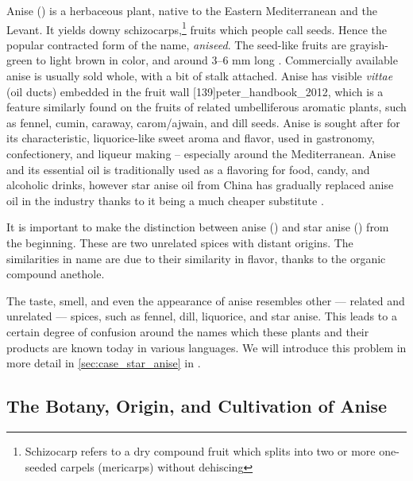 Anise () is a herbaceous plant, native to the Eastern Mediterranean and the Levant. It yields downy schizocarps,\footnote{Schizocarp refers to a dry compound fruit which splits into two or more one-seeded carpels (mericarps) without dehiscing} fruits which people call seeds. Hence the popular contracted form of the name, \textit{aniseed}. The seed-like fruits are grayish-green to light brown in color, and around 3--6 mm long \autocite[212]{van_wyk_culinary_2014}. Commercially available anise is usually sold whole, with a bit of stalk attached. Anise has visible \textit{vittae} (oil ducts) embedded in the fruit wall [139]{peter_handbook_2012}, which is a feature similarly found on the fruits of related umbelliferous aromatic plants, such as fennel, cumin, caraway, carom/ajwain, and dill seeds.
Anise is sought after for its characteristic, liquorice-like sweet aroma and flavor, used in gastronomy, confectionery, and liqueur making -- especially around the Mediterranean. 
Anise and its essential oil is traditionally used as a flavoring for food, candy, and alcoholic drinks, however star anise oil from China has gradually replaced anise oil in the industry thanks to it being a much cheaper substitute \autocite[212]{van_wyk_culinary_2014}. %


\begin{note}
It is important to make the distinction between anise () and star anise () from the beginning. These are two unrelated spices with distant origins. The similarities in name are due to their similarity in flavor, thanks to the organic compound anethole. 
\end{note}

The taste, smell, and even the appearance of anise resembles other --- related and unrelated --- spices, such as fennel, dill, liquorice, and star anise. This leads to a certain degree of confusion around the names which these plants and their products are known today in various languages. We will introduce this problem in more detail in \cref{sec:case_star_anise} in .

\subsection{The Botany, Origin, and  Cultivation of Anise}

